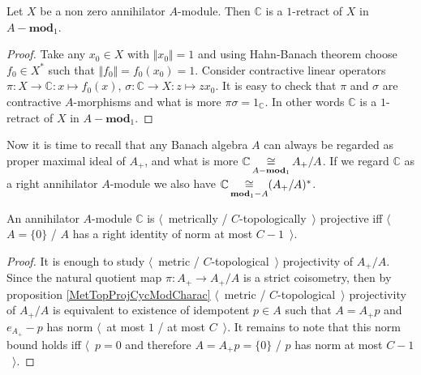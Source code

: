 \begin{proposition}\label{AnnihCModIsRetAnnihMod} Let $X$ be a non zero annihilator $A$-module. Then $\mathbb{C}$ is a $1$-retract of $X$ in $A-\mathbf{mod}_1$.
\end{proposition}
\begin{proof} Take any $x_0\in X$ with $\Vert x_0\Vert=1$ and using Hahn-Banach theorem choose $f_0\in X^*$ such that $\Vert f_0\Vert=f_0(x_0)=1$. Consider contractive linear operators $\pi:X\to \mathbb{C}:x\mapsto f_0(x)$, $\sigma:\mathbb{C}\to X:z\mapsto zx_0$. It is easy to check that $\pi$ and $\sigma$ are contractive $A$-morphisms and what is more $\pi\sigma=1_\mathbb{C}$. In other words $\mathbb{C}$ is a $1$-retract of $X$ in $A-\mathbf{mod}_1$.
\end{proof}

Now it is time to recall that any Banach algebra $A$ can always be regarded as proper maximal ideal of $A_+$, and what is more $\mathbb{C}\mathop{\mathbin{\cong}}\limits_{A-\mathbf{mod}_1} A_+/A$. If we regard $\mathbb{C}$ as a right annihilator $A$-module we also have $\mathbb{C}\mathop{\mathbin{\cong}}\limits_{\mathbf{mod}_1-A}(A_+/A)^*$. 

\begin{proposition}\label{MetTopProjModCCharac} An annihilator $A$-module $\mathbb{C}$ is $\langle$~metrically / $C$-topologically~$\rangle$ projective iff $\langle$~$A=\{0\}$ / $A$ has a right identity of norm at most $C-1$~$\rangle$.
\end{proposition}
\begin{proof} 
It is enough to study $\langle$~metric / $C$-topological~$\rangle$ projectivity of $A_+/A$. Since the natural quotient map $\pi:A_+\to A_+/A$ is a strict coisometry, then by proposition \ref{MetTopProjCycModCharac} $\langle$~metric / $C$-topological~$\rangle$ projectivity of $A_+/A$ is equivalent to existence of idempotent $p\in A$ such that $A=A_+p$ and $e_{A_+}-p$ has norm $\langle$~at most $1$ / at most $C$~$\rangle$. It remains to note that this norm bound holds iff $\langle$~$p=0$ and therefore $A=A_+p=\{0\}$ / $p$ has norm at most $C-1$~$\rangle$.
\end{proof}

